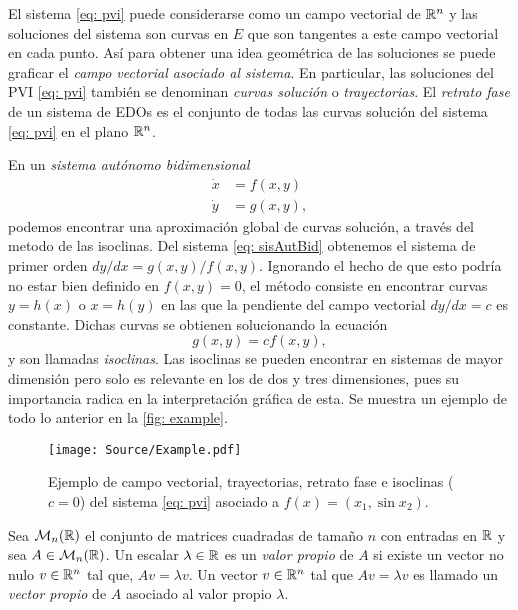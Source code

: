     El sistema \eqref{eq: pvi} puede considerarse como un campo vectorial de ${\mathbb{R}}^{n}$ y las soluciones del sistema son curvas en $E$ que son tangentes a este campo vectorial en cada punto. Así para obtener una idea geométrica de las soluciones se puede graficar el \textit{campo vectorial asociado al sistema}. En particular, las soluciones del PVI \eqref{eq: pvi} también se denominan \textit{curvas solución} o \textit{trayectorias}.
   El \textit{retrato fase} de un sistema de EDOs es el conjunto de todas las curvas solución del sistema \eqref{eq: pvi} en el plano ${\mathbb{R}}^{n}$.
   
   En un \textit{sistema autónomo bidimensional}
   \begin{equation}
   	\begin{aligned}
   		\dot{x} &= f(x, y) \\
   		\dot{y} &= g(x, y),
   	\end{aligned}
   	\label{eq: sisAutBid}
   \end{equation}
   podemos encontrar una aproximación global de curvas solución, a través del metodo de las isoclinas. Del sistema \eqref{eq: sisAutBid} obtenemos el sistema de primer orden $dy/dx = g(x, y)/f(x, y)$. Ignorando el hecho de que esto podría no estar bien definido en $f(x, y) = 0$, el método consiste en encontrar curvas $y=h(x)$ o $x=h(y)$ en las que la pendiente del campo vectorial $dy/dx = c$ es constante. Dichas curvas se obtienen solucionando la ecuación
   \begin{equation}
    g(x, y) = cf(x, y),
    \label{eq: pendiente}
   \end{equation} 
   y son llamadas \textit{isoclinas}. Las isoclinas se pueden encontrar en sistemas de mayor dimensión pero solo es relevante en los de dos y tres dimensiones, pues su importancia radica en la interpretación gráfica de esta. Se muestra un ejemplo de todo lo anterior en la \autoref{fig: example}.
   \begin{figure}
   	\centering
   	\texttt{[image: Source/Example.pdf]}
   	\caption{Ejemplo de campo vectorial, trayectorias, retrato fase e isoclinas ($c=0$) del sistema \eqref{eq: pvi} asociado a $f(x)=(x_{1},\sin{x_{2}})$.}
   	\label{fig: example}
   \end{figure}
   
    Sea $\mathcal{M}_{n}({\mathbb{R}})$ el conjunto de matrices cuadradas de tamaño $n$ con entradas en ${\mathbb{R}}$ y sea $A \in \mathcal{M}_{n}({\mathbb{R}})$. Un escalar $\lambda \in {\mathbb{R}}$ es un \textit{valor propio} de $A$ si existe un vector no nulo $v \in {\mathbb{R}}^{n}$ tal que, $Av = \lambda v$. Un vector $v \in {\mathbb{R}}^{n}$ tal que $Av = \lambda v$ es llamado un \textit{vector propio} de $A$ asociado al valor propio $\lambda$.
   
